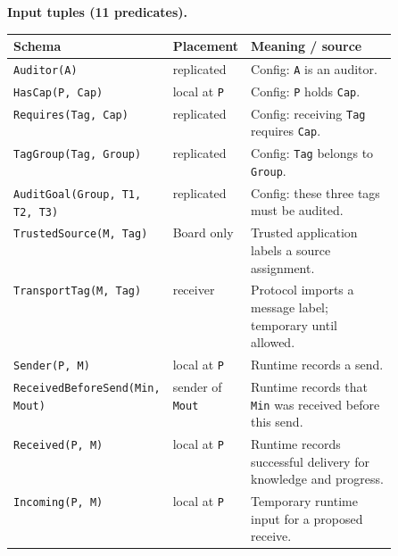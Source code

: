 \documentclass[10pt]{article}
\begin{document}
\textbf{Input tuples (11 predicates).}
\begin{center}\small
\setlength{\tabcolsep}{4pt}
\renewcommand{\arraystretch}{1.15}
\begin{tabularx}{\linewidth}{@{}p{0.34\linewidth} >{\raggedright\arraybackslash}p{0.16\linewidth} >{\raggedright\arraybackslash}X@{}}
\toprule
\textbf{Schema} & \textbf{Placement} & \textbf{Meaning / source}\\
\midrule
\texttt{Auditor(A)} & replicated & Config: \texttt{A} is an auditor.\\
\texttt{HasCap(P, Cap)} & local at \texttt{P} & Config: \texttt{P} holds \texttt{Cap}.\\
\texttt{Requires(Tag, Cap)} & replicated & Config: receiving \texttt{Tag} requires \texttt{Cap}.\\
\texttt{TagGroup(Tag, Group)} & replicated & Config: \texttt{Tag} belongs to \texttt{Group}.\\
\texttt{AuditGoal(Group, T1, T2, T3)} & replicated & Config: these three tags must be audited.\\
\texttt{TrustedSource(M, Tag)} & Board only & Trusted application labels a source assignment.\\
\texttt{TransportTag(M, Tag)} & receiver & Protocol imports a message label; temporary until allowed.\\
\texttt{Sender(P, M)} & local at \texttt{P} & Runtime records a send.\\
\texttt{ReceivedBeforeSend(Min, Mout)} & sender of \texttt{Mout} & Runtime records that \texttt{Min} was received before this send.\\
\texttt{Received(P, M)} & local at \texttt{P} & Runtime records successful delivery for knowledge and progress.\\
\texttt{Incoming(P, M)} & local at \texttt{P} & Temporary runtime input for a proposed receive.\\
\bottomrule
\end{tabularx}
\end{center}
\end{document}
